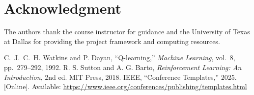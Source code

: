 \documentclass[conference]{IEEEtran}
\begin{document}
\section*{Acknowledgment}
The authors thank the course instructor for guidance and the University of Texas at Dallas for providing the project framework and computing resources.

\begin{thebibliography}{00}
C.~J.~C.~H. Watkins and P. Dayan, ``Q-learning,'' \emph{Machine Learning}, vol.~8, pp.~279–292, 1992.
R. S. Sutton and A. G. Barto, \emph{Reinforcement Learning: An Introduction}, 2nd ed. MIT Press, 2018.
IEEE, ``Conference Templates,'' 2025. [Online]. Available: \url{https://www.ieee.org/conferences/publishing/templates.html}
\end{thebibliography}
\end{document}
